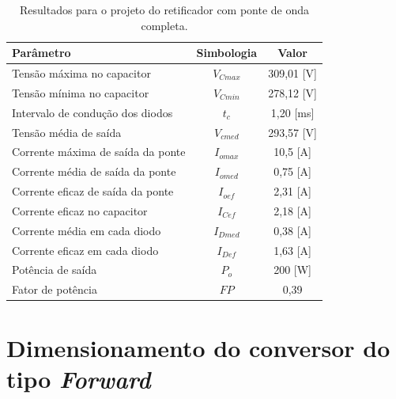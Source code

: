 \begin{apendicesenv}
\begin{table}[H]
    \centering
    \caption{Resultados para o projeto do retificador com ponte de onda completa.}
    \label{retificador_resultados}
    \begin{adjustbox}{max width = \textwidth}
        \begin{tabular}{|l|c|c|}
            \hline
            \rowcolor[HTML]{A8DADC}
            \textbf{Parâmetro} & \textbf{Simbologia} & \textbf{Valor}
            \\ \hline
            Tensão máxima no capacitor & $V_{Cmax}$ &  309,01 [V]
             \\ \hline
            Tensão mínima no capacitor & $V_{Cmin}$ &  278,12 [V]
             \\ \hline
            Intervalo de condução dos diodos & $t_{c}$ & 1,20 [ms]
             \\ \hline
            Tensão média de saída & $V_{cmed}$ & 293,57 [V]
             \\ \hline
            Corrente máxima de saída da ponte & $I_{omax}$ & 10,5 [A]
             \\ \hline
            Corrente média de saída da ponte & $I_{omed}$ &  0,75 [A]
             \\ \hline
            Corrente eficaz de saída da ponte & $I_{oef}$ & 2,31 [A]
             \\ \hline
            Corrente eficaz no capacitor & $I_{Cef}$ &  2,18 [A]
             \\ \hline
            Corrente média em cada diodo & $I_{Dmed}$ &  0,38 [A]
             \\ \hline
            Corrente eficaz em cada diodo & $I_{Def}$ & 1,63 [A]
             \\ \hline
            Potência de saída & $P_{o}$ &  200 [W]
             \\ \hline
            Fator de potência & $FP$ &  0,39
             \\ \hline
        \end{tabular}
    \end{adjustbox}
\end{table}

\section{Dimensionamento do conversor do tipo \textit{Forward}}


\end{apendicesenv}

